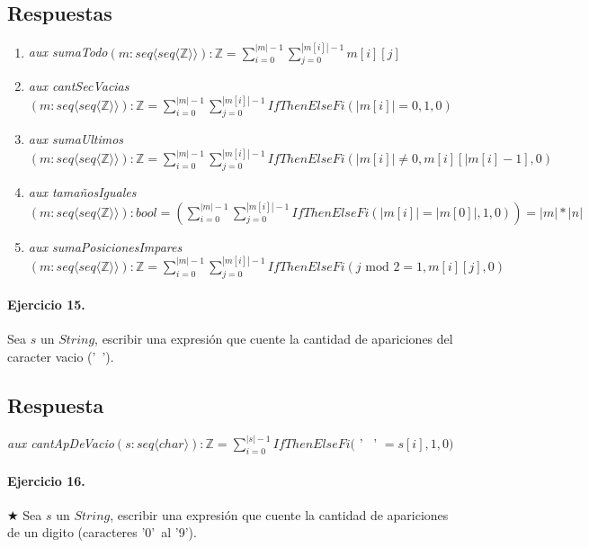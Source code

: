 \documentclass[a4paper]{article}
\begin{document}
\subsection*{Respuestas}

\begin{enumerate}[label=\alph*)]
	\item \textit{aux sumaTodo}$(m: seq\langle seq\langle \mathbb{Z}\rangle \rangle):\mathbb{Z}
	=\sum_{i=0}^{|m|-1}\sum_{j=0}^{|m[i]|-1} m[i][j]$
	\item \textit{aux cantSecVacias}$(m: seq\langle seq\langle \mathbb{Z}\rangle \rangle):\mathbb{Z}
	=\sum_{i=0}^{|m|-1}\sum_{j=0}^{|m[i]|-1} IfThenElseFi(|m[i]|=0,1,0)$
	\item \textit{aux sumaUltimos}$(m: seq\langle seq\langle \mathbb{Z}\rangle \rangle):\mathbb{Z}
	=\sum_{i=0}^{|m|-1}\sum_{j=0}^{|m[i]|-1} IfThenElseFi(|m[i]|\neq 0,m[i][|m[i]-1],0)$
	\item \textit{aux tamañosIguales}$(m: seq\langle seq\langle \mathbb{Z}\rangle \rangle):bool
	=(\sum_{i=0}^{|m|-1}\sum_{j=0}^{|m[i]|-1} IfThenElseFi(|m[i]|=|m[0]|,1,0))=|m|*|n|$
	\item \textit{aux sumaPosicionesImpares}$(m: seq\langle seq\langle \mathbb{Z}\rangle \rangle):\mathbb{Z}
	=\sum_{i=0}^{|m|-1}\sum_{j=0}^{|m[i]|-1} IfThenElseFi(j\textrm{ mod }2=1,m[i][j],0)$
\end{enumerate}
\paragraph{Ejercicio 15.} Sea $s$ un $String$, escribir una expresión que cuente la cantidad de apariciones del caracter vacio ('\ ').

\subsection*{Respuesta}

\textit{aux cantApDeVacio}$(s:seq\langle char\rangle):\mathbb{Z}
= \sum_{i=0}^{|s|-1} IfThenElseFi($ ' \ ' $=s[i],1,0)$

\paragraph{Ejercicio 16.} $\bigstar$ Sea $s$ un $String$, escribir una expresión que cuente la cantidad de apariciones de un digito (caracteres  '0'\  al '9').
\end{document}
